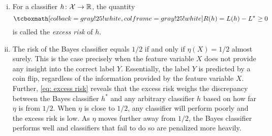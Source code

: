 \begin{remark}
    \begin{enumerate}[(i)]
        \item For a classifier $h \colon \mathcal{X} \to \mathbb{R}$, the quantity
        \[
            \highlightMath{
                R(h) = L(h) - L^* \geq 0
            }
        \]
        is called the \emph{excess risk} of $h$.
        
        \item The risk of the Bayes classifier equals $1/2$ if and only if $\eta(X) = 1/2$ almost surely. This is the case precisely when the feature variable $X$ does not provide any insight into the correct label $Y$. Essentially, the label $Y$ is predicted by a coin flip, regardless of the information provided by the feature variable $X$. Further, \eqref{eq: excess risk} reveals that the excess risk weighs the discrepancy between the Bayes classifier $h^*$ and any arbitrary classifier $h$ based on how far $\eta$ is from $1/2$. When $\eta$ is close to $1/2$, any classifier will perform poorly and the excess risk is low. As $\eta$ moves further away from $1/2$, the Bayes classifier performs well and classifiers that fail to do so are penalized more heavily.
    \end{enumerate}
\end{remark}

